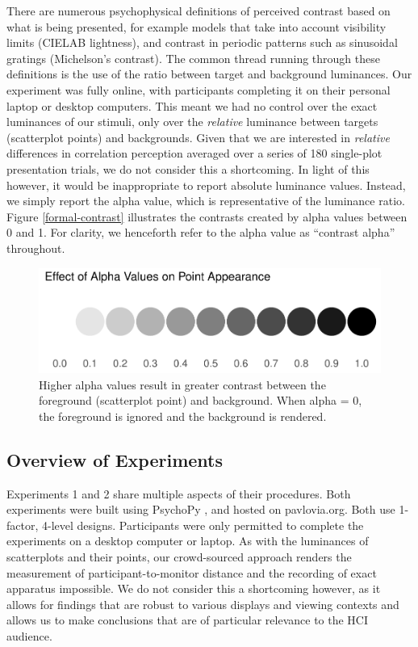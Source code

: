 \documentclass[preprint, 3p,
authoryear]{elsarticle} %
\begin{document}
There are numerous psychophysical definitions of perceived contrast
\citep{zuffi_2007} based on what is being presented, for example models
that take into account visibility limits (CIELAB lightness), and
contrast in periodic patterns such as sinusoidal gratings (Michelson's
contrast). The common thread running through these definitions is the
use of the ratio between target and background luminances. Our
experiment was fully online, with participants completing it on their
personal laptop or desktop computers. This meant we had no control over
the exact luminances of our stimuli, only over the \emph{relative}
luminance between targets (scatterplot points) and backgrounds. Given
that we are interested in \emph{relative} differences in correlation
perception averaged over a series of 180 single-plot presentation
trials, we do not consider this a shortcoming. In light of this however,
it would be inappropriate to report absolute luminance values. Instead,
we simply report the alpha value, which is representative of the
luminance ratio. Figure \ref{formal-contrast} illustrates the contrasts
created by alpha values between 0 and 1. For clarity, we henceforth
refer to the alpha value as ``contrast alpha'' throughout.

\begin{figure}

\includegraphics[width=0.5\linewidth]{contrast_and_scatterplots_files/figure-latex/formal-contrast-1} \hfill{}

\caption{\label{formal-contrast}Higher alpha values result in greater contrast between the foreground (scatterplot point) and background. When alpha = 0, the foreground is ignored and the background is rendered.}\label{fig:formal-contrast}
\end{figure}

\hypertarget{overview-of-experiments}{%
\subsection{Overview of Experiments}\label{overview-of-experiments}}

Experiments 1 and 2 share multiple aspects of their procedures. Both
experiments were built using PsychoPy \citep{pierce_psychopy_2019}, and
hosted on pavlovia.org. Both use 1-factor, 4-level designs. Participants
were only permitted to complete the experiments on a desktop computer or
laptop. As with the luminances of scatterplots and their points, our
crowd-sourced approach renders the measurement of participant-to-monitor
distance and the recording of exact apparatus impossible. We do not
consider this a shortcoming however, as it allows for findings that are
robust to various displays and viewing contexts and allows us to make
conclusions that are of particular relevance to the HCI audience.
\end{document}

